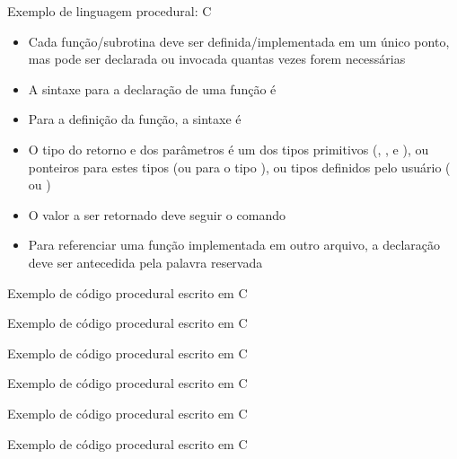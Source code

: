 \begin{frame}[fragile]{Exemplo de linguagem procedural: C}

    \begin{itemize}
        \item Cada função/subrotina deve ser definida/implementada em um único ponto, mas pode
            ser declarada ou invocada quantas vezes forem necessárias

        \item A sintaxe para a declaração de uma função é


        \item Para a definição da função, a sintaxe é

        \item O tipo do retorno e dos parâmetros é um dos tipos primitivos (,
            ,  e ), ou ponteiros para estes tipos
            (ou para o tipo ), ou tipos definidos pelo usuário ( ou
                )

        \item O valor a ser retornado deve seguir o comando 

        \item Para referenciar uma função implementada em outro arquivo, a declaração deve ser
            antecedida pela palavra reservada 
    \end{itemize}

\end{frame}

\begin{frame}[fragile]{Exemplo de código procedural escrito em C}
\end{frame}

\begin{frame}[fragile]{Exemplo de código procedural escrito em C}
\end{frame}

\begin{frame}[fragile]{Exemplo de código procedural escrito em C}
\end{frame}

\begin{frame}[fragile]{Exemplo de código procedural escrito em C}
\end{frame}

\begin{frame}[fragile]{Exemplo de código procedural escrito em C}
\end{frame}

\begin{frame}[fragile]{Exemplo de código procedural escrito em C}
\end{frame}
